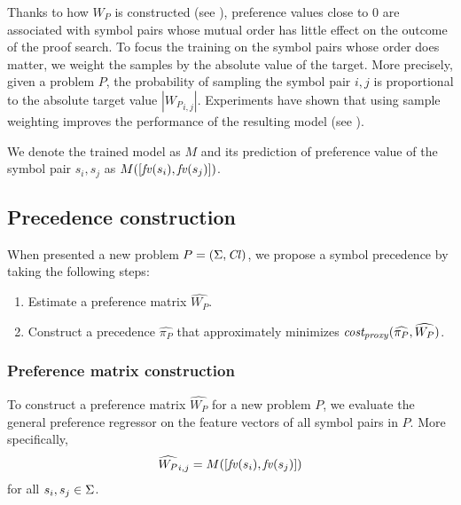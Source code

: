 \documentclass[a4paper]{easychair}
\begin{document}
Thanks to how \(W_P\) is constructed (see ),
preference values close to 0 are associated with symbol pairs whose mutual order has little effect
on the outcome of the proof search.
To focus the training on the symbol pairs whose order does matter,
we weight the samples by the absolute value of the target.
More precisely, given a problem $P$,
the probability of sampling the symbol pair $i,j$
is proportional to the absolute target value $|{W_P}_{i,j}|$.
%
Experiments have shown that using sample weighting
improves the performance of the resulting model (see ).



\newcommand{\GeneralRegressor}{M}
We denote the trained model as \(\GeneralRegressor\)
and its prediction of preference value of the symbol pair \(s_i, s_j\)
as \(\GeneralRegressor([\fv(s_i), \fv(s_j)])\).

\subsection{Precedence construction} \label{sect:construction}

When presented a new problem \(P = (\operatorname{\Sigma}, \operatorname{\mathit{Cl}})\), we propose a symbol precedence by taking the following steps:
\begin{enumerate}
	\item Estimate a preference matrix \(\widehat{W_P}\).
	\item Construct a precedence \(\widehat{\pi_P}\) that approximately minimizes
	\(\operatorname{\mathit{cost_{proxy}}}(\widehat{\pi_P}, \widehat{W_P})\).
\end{enumerate}

\subsubsection{Preference matrix construction}

To construct a preference matrix \(\widehat{W_P}\) for a new problem \(P\),
we evaluate the general preference regressor
on the feature vectors of all symbol pairs in \(P\).
More specifically,
\begin{align*}
\widehat{W_P}_{i, j} = M([\mathit{fv}(s_i), \mathit{fv}(s_j)])
\end{align*}
for all \(s_i, s_j \in \operatorname{\Sigma}\).
\end{document}
